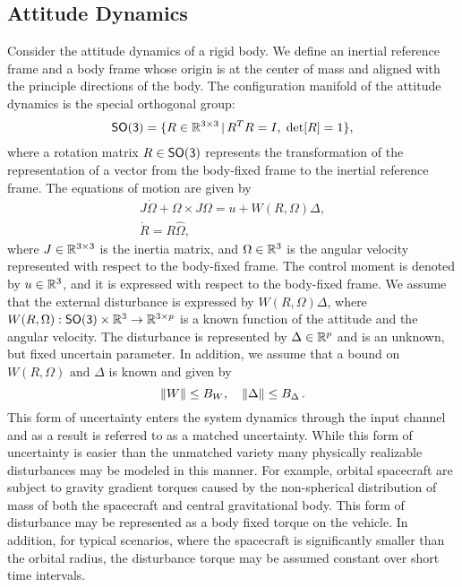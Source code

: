 \documentclass[letterpaper, 10 pt, conference]{ieeeconf}  %
\begin{document}
\subsection{Attitude Dynamics}\label{sec:att_dyn}
Consider the attitude dynamics of a rigid body. 
We define an inertial reference frame and a body frame whose origin is at the center of mass and aligned with the principle directions of the body. 
The configuration manifold of the attitude dynamics is the special orthogonal group:
\begin{align*}
	\mathsf{SO(3)} = \{R\in\mathbb{R}^{3\times 3}\,|\, R^TR=I,\;\mathrm{det}[R]=1\} ,
\end{align*}
where a rotation matrix $R\in\mathsf{SO(3)}$ represents the transformation of the representation of a vector from the body-fixed frame to the inertial reference frame. 
The equations of motion are given by
\begin{gather}
	J\dot\Omega + \Omega\times J\Omega = u+W(R,\Omega)\Delta ,\label{eqn:Wdot}\\
	\dot R = R\hat\Omega ,\label{eqn:Rdot}
\end{gather}
where $J\in\mathbb{R}^{3\times 3}$ is the inertia matrix, and $\Omega\in\mathbb{R}^{3}$ is the angular velocity represented with respect to the body-fixed frame. 
The control moment is denoted by $u\in\mathbb{R}^{3}$, and it is expressed with respect to the body-fixed frame. 
We assume that the external disturbance is expressed by $W(R,\Omega)\Delta$, where $W(R,\Omega):\mathsf{SO(3)}\times\mathbb{R}^{3}\rightarrow \mathbb{R}^{3\times p}$ is a known function of the attitude and the angular velocity.
The disturbance is represented by $\Delta\in\mathbb{R}^{p}$ and is an unknown, but fixed uncertain parameter.
In addition, we assume that a bound on \( W(R, \Omega) \text{ and } \Delta \) is known and given by
\begin{equation}
	\left\| W \right\| \leq B_W , \quad \left\| \Delta \right\| \leq B_\Delta \,. \label{eqn:W_bound}
\end{equation}
This form of uncertainty enters the system dynamics through the input channel and as a result is referred to as a matched uncertainty. 
While this form of uncertainty is easier than the unmatched variety many physically realizable disturbances may be modeled in this manner.
For example, orbital spacecraft are subject to gravity gradient torques caused by the non-spherical distribution of mass of both the spacecraft and central gravitational body.
This form of disturbance may be represented as a body fixed torque on the vehicle.
In addition, for typical scenarios, where the spacecraft is significantly smaller than the orbital radius, the disturbance torque may be assumed constant over short time intervals.
\end{document}
